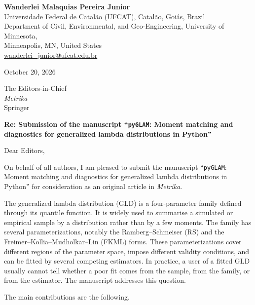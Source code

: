 \documentclass[11pt,a4paper]{article}
\begin{document}
\textbf{Wanderlei Malaquias Pereira Junior}\\
Universidade Federal de Catalão (UFCAT), Catalão, Goiás, Brazil\\
Department of Civil, Environmental, and Geo-Engineering, University of Minnesota,\\
Minneapolis, MN, United States\\
\href{mailto:wanderlei_junior@ufcat.edu.br}{wanderlei\_junior@ufcat.edu.br}

October 20, 2026

The Editors-in-Chief\\
\emph{Metrika}\\
Springer

\textbf{Re: Submission of the manuscript ``\texttt{pyGLAM}: Moment matching and diagnostics for generalized lambda distributions in Python''}

Dear Editors,

On behalf of all authors, I am pleased to submit the manuscript ``\texttt{pyGLAM}: Moment matching and diagnostics for generalized lambda distributions in Python'' for consideration as an original article in \emph{Metrika}.

The generalized lambda distribution (GLD) is a four-parameter family defined through its quantile function. It is widely used to summarise a simulated or empirical sample by a distribution rather than by a few moments. The family has several parameterizations, notably the Ramberg--Schmeiser (RS) and the Freimer--Kollia--Mudholkar--Lin (FKML) forms. These parameterizations cover different regions of the parameter space, impose different validity conditions, and can be fitted by several competing estimators. In practice, a user of a fitted GLD usually cannot tell whether a poor fit comes from the sample, from the family, or from the estimator. The manuscript addresses this question.

The main contributions are the following.
\end{document}
